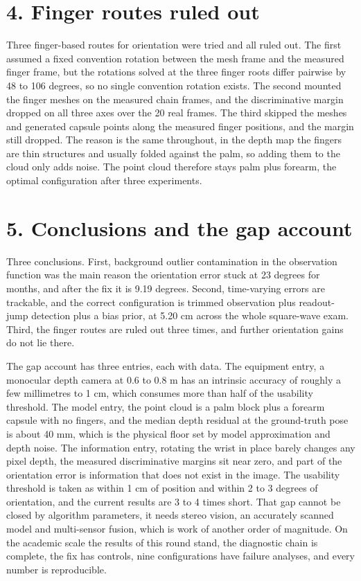 \documentclass{article}
\begin{document}
\section{4. Finger routes ruled out}
Three finger-based routes for orientation were tried and all ruled out. The first assumed a fixed convention rotation between the mesh frame and the measured finger frame, but the rotations solved at the three finger roots differ pairwise by 48 to 106 degrees, so no single convention rotation exists. The second mounted the finger meshes on the measured chain frames, and the discriminative margin dropped on all three axes over the 20 real frames. The third skipped the meshes and generated capsule points along the measured finger positions, and the margin still dropped. The reason is the same throughout, in the depth map the fingers are thin structures and usually folded against the palm, so adding them to the cloud only adds noise. The point cloud therefore stays palm plus forearm, the optimal configuration after three experiments.

\section{5. Conclusions and the gap account}
Three conclusions. First, background outlier contamination in the observation function was the main reason the orientation error stuck at 23 degrees for months, and after the fix it is 9.19 degrees. Second, time-varying errors are trackable, and the correct configuration is trimmed observation plus readout-jump detection plus a bias prior, at 5.20 cm across the whole square-wave exam. Third, the finger routes are ruled out three times, and further orientation gains do not lie there.

The gap account has three entries, each with data. The equipment entry, a monocular depth camera at 0.6 to 0.8 m has an intrinsic accuracy of roughly a few millimetres to 1 cm, which consumes more than half of the usability threshold. The model entry, the point cloud is a palm block plus a forearm capsule with no fingers, and the median depth residual at the ground-truth pose is about 40 mm, which is the physical floor set by model approximation and depth noise. The information entry, rotating the wrist in place barely changes any pixel depth, the measured discriminative margins sit near zero, and part of the orientation error is information that does not exist in the image. The usability threshold is taken as within 1 cm of position and within 2 to 3 degrees of orientation, and the current results are 3 to 4 times short. That gap cannot be closed by algorithm parameters, it needs stereo vision, an accurately scanned model and multi-sensor fusion, which is work of another order of magnitude. On the academic scale the results of this round stand, the diagnostic chain is complete, the fix has controls, nine configurations have failure analyses, and every number is reproducible.
\end{document}
